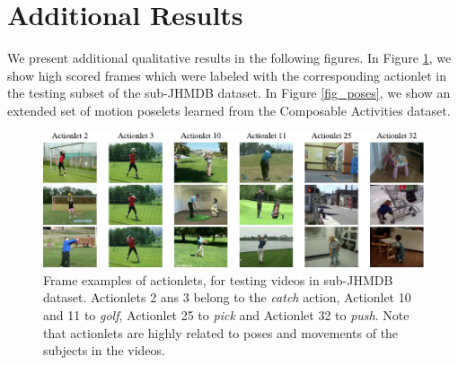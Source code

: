 \documentclass[10pt,letterpaper]{article}
\newcommand{\+}[1]{\ensuremath{{\boldsymbol #1}}}
\begin{document}
\section{Additional Results}

We present additional qualitative results in the following figures. In Figure \ref{fig_actionlets}, we show high scored frames which were labeled with the corresponding actionlet in the testing subset of the sub-JHMDB dataset. In Figure \ref{fig_poses}, we show an extended set of motion poselets learned from the Composable Activities dataset. 

\begin{figure}[tb]
\begin{center}
\includegraphics[width=0.999\linewidth]{../Fig/fig_actionlets_subJHMDB.pdf}
\end{center}
\caption{Frame examples of actionlets, for testing videos in sub-JHMDB dataset. Actionlets 2 ans 3 belong to the \textit{catch} action, Actionlet 10 and 11 to \emph{golf}, Actionlet 25 to \emph{pick} and Actionlet 32 to \emph{push}. Note that actionlets are highly related to poses and movements of the subjects in the videos.  }
\label{fig_actionlets}
\end{figure}
\end{document}
